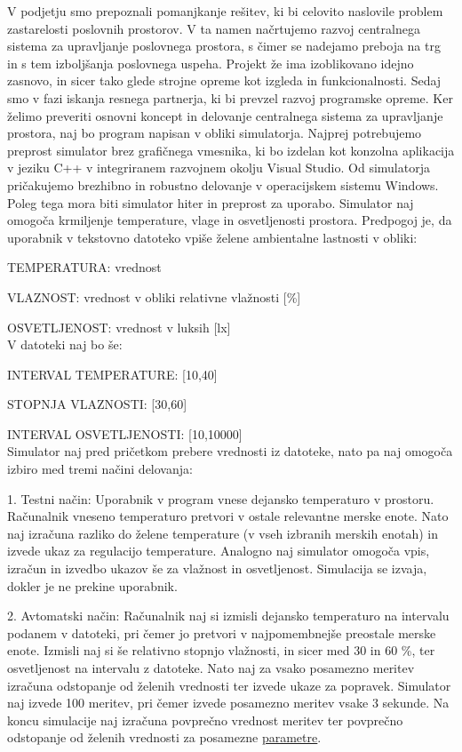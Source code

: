 \documentclass[a4paper,12pt]{article}
\begin{document}
	V podjetju smo prepoznali pomanjkanje rešitev, ki bi celovito naslovile 
	problem zastarelosti poslovnih prostorov. V ta namen načrtujemo razvoj centralnega 
	sistema za upravljanje poslovnega prostora, s čimer se nadejamo preboja na trg 
	in s tem izboljšanja poslovnega uspeha. Projekt že ima izoblikovano idejno zasnovo, 
	in sicer tako glede strojne opreme kot izgleda in funkcionalnosti. Sedaj smo v fazi 
	iskanja resnega partnerja, ki bi prevzel razvoj programske opreme. Ker želimo preveriti 
	osnovni koncept in delovanje centralnega sistema za upravljanje prostora, naj bo program 
	napisan v obliki simulatorja. Najprej potrebujemo preprost simulator brez grafičnega 
	vmesnika, ki bo izdelan kot konzolna aplikacija v jeziku C++ v integriranem razvojnem 
	okolju Visual Studio. Od simulatorja pričakujemo brezhibno in robustno delovanje v 
	operacijskem sistemu Windows. Poleg tega mora biti simulator hiter in preprost za uporabo. 
	Simulator naj omogoča krmiljenje temperature, vlage in osvetljenosti prostora. Predpogoj 
	je, da uporabnik v tekstovno datoteko vpiše želene ambientalne lastnosti v obliki: 
	
	TEMPERATURA: vrednost 

	VLAZNOST: vrednost v obliki relativne vlažnosti [\%] 

	OSVETLJENOST: vrednost v luksih [lx] 
	\\
	V datoteki naj bo še: 

	INTERVAL TEMPERATURE: [10,40]
	
	STOPNJA VLAZNOSTI: [30,60]

	INTERVAL OSVETLJENOSTI: [10,10000] 
	\\
	Simulator naj pred pričetkom prebere 
	vrednosti iz datoteke, nato pa naj omogoča izbiro med tremi načini delovanja: 

	1. Testni način: Uporabnik v program vnese dejansko temperaturo v prostoru. Računalnik vneseno 
	temperaturo pretvori v ostale relevantne merske enote. Nato naj izračuna razliko do 
	želene temperature (v vseh izbranih merskih enotah) in izvede ukaz za regulacijo 
	temperature. Analogno naj simulator omogoča vpis, izračun in izvedbo ukazov še za 
	vlažnost in osvetljenost. Simulacija se izvaja, dokler je ne prekine uporabnik. 
	
	2. Avtomatski način: Računalnik naj si izmisli dejansko temperaturo na intervalu 
	podanem v datoteki, pri čemer jo pretvori v najpomembnejše preostale merske enote. 
	Izmisli naj si še relativno stopnjo vlažnosti, in sicer med 30 in 60 \%, ter osvetljenost 
	na intervalu z datoteke. Nato naj za vsako posamezno meritev izračuna odstopanje od 
	želenih vrednosti ter izvede ukaze za popravek. Simulator naj izvede 100 meritev, pri 
	čemer izvede posamezno meritev vsake 3 sekunde. Na koncu simulacije naj izračuna 
	povprečno vrednost meritev ter povprečno odstopanje od želenih vrednosti za posamezne 
	\hyperlink{subsection.1.8}{\ul{parametre}}. 
\end{document}
